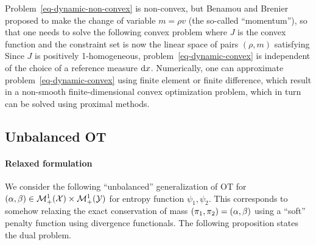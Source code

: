 Problem~\eqref{eq-dynamic-non-convex} is non-convex, but Benamou and Brenier proposed to make the change of variable $m=\rho v$ (the so-called ``momentum''), so that one needs to solve the following convex problem
where $J$ is the convex function
and the constraint set is now the linear space of pairs $(\rho,m)$ satisfying
Since $J$ is positively 1-homogeneous, problem~\eqref{eq-dynamic-convex} is independent of the choice of a reference measure $\mathrm{d} x$.
%
Numerically, one can approximate problem~\eqref{eq-dynamic-convex} using finite element or finite difference, which result in a non-smooth finite-dimensional convex optimization problem, which in turn can be solved using proximal methods. 

\subsection{Unbalanced OT}
\label{sec-unbalanced}


\paragraph{Relaxed formulation}

We consider the following ``unbalanced'' generalization of OT for $(\alpha,\beta) \in \mathcal{M}_+^1(\mathcal{X}) \times \mathcal{M}_+^1(\mathcal{Y})$
for entropy function $\psi_1,\psi_2$.
%
This corresponds to somehow relaxing the exact conservation of mass $(\pi_1,\pi_2)=(\alpha,\beta)$ using a ``soft'' penalty function using divergence functionals.
%
The following proposition states the dual problem.

